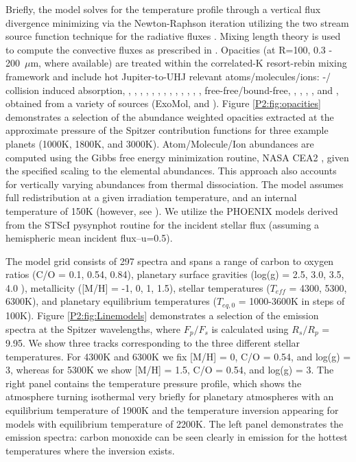 Briefly, the model solves for the temperature profile through a vertical flux divergence minimizing via the Newton-Raphson iteration \citep{McKay1989} utilizing the two stream source function technique for the radiative fluxes \citep{Toon1989}. Mixing length theory is used to compute the convective fluxes as prescribed in \citet{Hubeny2017}.  Opacities (at R=100, 0.3 - 200~$\mu$m, where available) are treated within the correlated-K resort-rebin mixing framework \citep{Lacis1991, Amundsen2017} and include hot Jupiter-to-UHJ relevant atoms/molecules/ions: -/ collision induced absorption, , , , , , , , , , , , , ,  free-free/bound-free, , , , , and , obtained from a variety of sources (ExoMol, \citet{Freedman2008, Freedman2014} and \citet{Kurucz1995}). Figure \ref{P2:fig:opacities} demonstrates a selection of the abundance weighted opacities extracted at the approximate pressure of the Spitzer contribution functions for three example planets (1000K, 1800K, and 3000K). Atom/Molecule/Ion abundances are computed using the Gibbs free energy minimization routine, NASA CEA2 \citep{Gordon1994}, given the specified scaling to the \citet{Lodders2009a} elemental abundances. This approach also accounts for vertically varying abundances from thermal dissociation. The model assumes full redistribution at a given irradiation temperature, and an internal temperature of 150K (however, see \citet{Thorngren2019}). We utilize the PHOENIX \citep{Allard2011} models derived from the STScI pysynphot routine for the incident stellar flux (assuming a hemispheric mean incident flux--u=0.5).

The model grid consists of 297 spectra and spans a range of carbon to oxygen ratios (C/O = 0.1, 0.54, 0.84), planetary surface gravities (log(g) = 2.5, 3.0, 3.5, 4.0 ), metallicity ([M/H] = -1, 0, 1, 1.5), stellar temperatures ($T_{eff}$ = 4300, 5300, 6300K), and planetary equilibrium temperatures ($T_{eq,\textit{0}}$ = 1000-3600K in steps of 100K).
Figure \ref{P2:fig:Linemodels} demonstrates a selection of the emission spectra at the Spitzer wavelengths, where $F_p/F_s$ is calculated using $R_s/R_p$ = 9.95. We show three tracks corresponding to the three different stellar temperatures. For 4300K and 6300K we fix [M/H] = 0, C/O = 0.54, and log(g) = 3, whereas for 5300K we show [M/H] = 1.5, C/O = 0.54, and log(g) = 3. The right panel contains the temperature pressure profile, which shows the atmosphere turning isothermal very briefly for planetary atmospheres with an equilibrium temperature of 1900K and the temperature inversion appearing for models with equilibrium temperature of 2200K. The left panel demonstrates the emission spectra: carbon monoxide can be seen clearly in emission for the hottest temperatures where the inversion exists.

